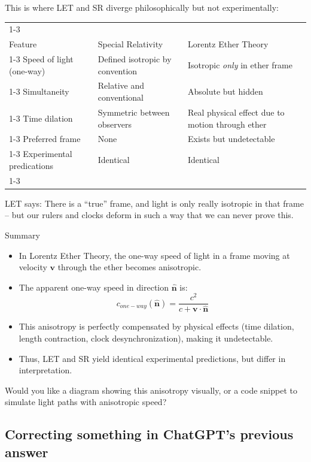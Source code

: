 \documentclass[a4paper]{article}
\theoremstyle{plain}
\theoremstyle{definition}
\newcommand{\vect}[1]{\mathbf{#1}}
\newcommand{\hatvec}[1]{\hat{\mathbf{#1}}}
\begin{document}
This is where LET and SR diverge philosophically but not
experimentally:

\begin{tabularx}{1.0\textwidth}{|p{4.5cm}|p{4.5cm}|p{4.5cm}|}
\cline{1-3} \\
Feature & Special Relativity & Lorentz Ether Theory
\\ \cline{1-3}
Speed of light (one-way) & Defined isotropic by convention & Isotropic {\em only} in ether frame
\\ \cline{1-3}
Simultaneity & Relative and conventional & Absolute but hidden
\\ \cline{1-3}
Time dilation & Symmetric between observers & Real physical effect due to motion through ether
\\ \cline{1-3}
Preferred frame & None & Exists but undetectable
\\ \cline{1-3}
Experimental predications & Identical & Identical
\\ \cline{1-3}
\end{tabularx}
LET says: There is a ``true'' frame, and light is only really
isotropic in that frame -- but our rulers and clocks deform in such a
way that we can never prove this.

Summary

\begin{itemize}
\item In Lorentz Ether Theory, the one-way speed of light in a frame
  moving at velocity $\vect{v}$ through the ether becomes anisotropic.
\item The apparent one-way speed in direction $\hatvec{n}$ is:
\begin{equation}
c_{one-way}(\hatvec{n}) = \frac{c^2}{c + \vect{v}\cdot\hatvec{n}}
\end{equation}
\item This anisotropy is perfectly compensated by physical effects
  (time dilation, length contraction, clock desynchronization), making
  it undetectable.
\item Thus, LET and SR yield identical experimental predictions, but
  differ in interpretation.
\end{itemize}

Would you like a diagram showing this anisotropy visually, or a code
snippet to simulate light paths with anisotropic speed?


\subsection{Correcting something in ChatGPT's previous answer}
\end{document}
